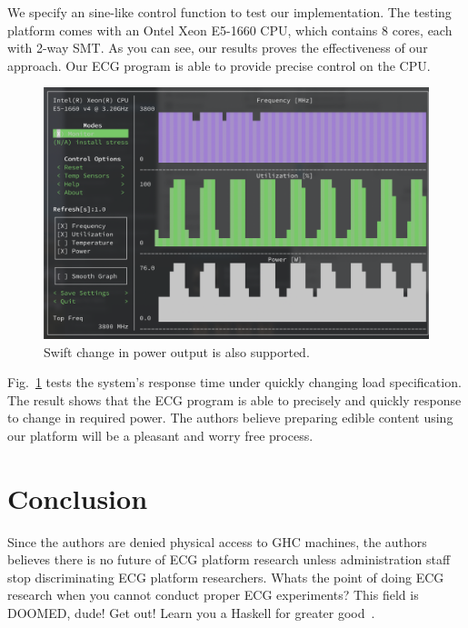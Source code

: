 \documentclass[conference]{IEEEtran}
\begin{document}
We specify an sine-like control function to test our implementation. The testing platform comes with an Ontel Xeon E5-1660 CPU, which contains 8 cores, each with 2-way SMT. As you can see, our results proves the effectiveness of our approach. Our ECG program is able to provide precise control on the CPU. 

\begin{figure}[htbp]
\centerline{\includegraphics[width=\linewidth]{fig/result2.png}}
\caption{Swift change in power output is also supported.}
\label{swift}
\end{figure}

Fig.~\ref{swift} tests the system's response time under quickly changing load specification. The result shows that the ECG program is able to precisely and quickly response to change in required power. The authors believe preparing edible content using our platform will be a pleasant and worry free process.

\section{Conclusion}

Since the authors are denied physical access to GHC machines, the authors believes there is no future of ECG platform research
unless administration staff stop discriminating ECG platform researchers. Whats the point of doing ECG research when you cannot
conduct proper ECG experiments? This field is DOOMED, dude! Get out! Learn you a Haskell for greater good~\cite{harper2016practical}. 


\ifCLASSOPTIONcaptionsoff
  \newpage
\fi


\end{document}
